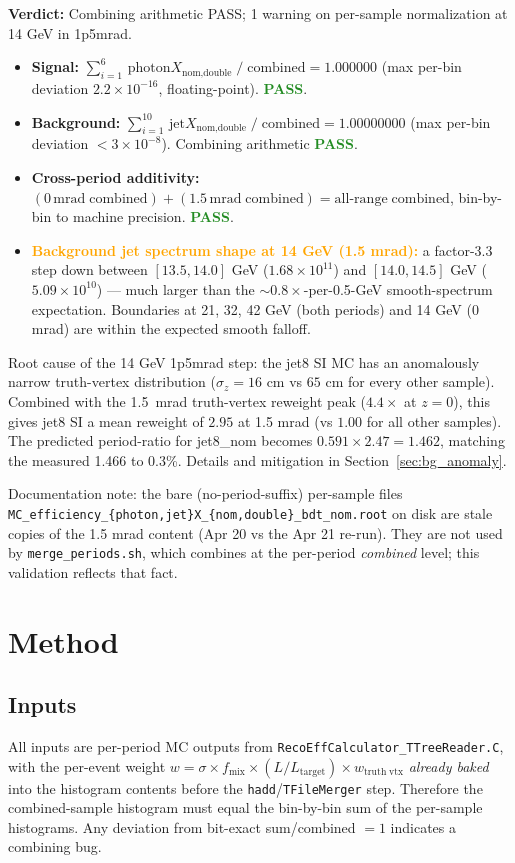 \documentclass[11pt,a4paper]{article}
\newcommand{\warn}[1]{\textcolor{orange}{\textbf{#1}}}
\newcommand{\pass}{\textcolor{ForestGreen}{\textbf{PASS}}}
\begin{document}
\textbf{Verdict:} Combining arithmetic PASS; 1 warning on per-sample normalization at 14 GeV in 1p5mrad.
\begin{itemize}
  \item \textbf{Signal:} $\sum_{i=1}^{6}\,\text{photon}X_{\text{nom,double}} \;/\; \text{combined} = 1.000000$ (max per-bin deviation $2.2\times 10^{-16}$, floating-point). \pass.
  \item \textbf{Background:} $\sum_{i=1}^{10}\,\text{jet}X_{\text{nom,double}} \;/\; \text{combined} = 1.00000000$ (max per-bin deviation $< 3\times 10^{-8}$). Combining arithmetic \pass.
  \item \textbf{Cross-period additivity:} $(\mathrm{0\,mrad\;combined}) + (\mathrm{1.5\,mrad\;combined}) = \mathrm{all\text{-}range\;combined}$, bin-by-bin to machine precision. \pass.
  \item \warn{\textbf{Background jet spectrum shape at 14 GeV (1.5 mrad):}} a factor-3.3 step down between $[13.5, 14.0]$ GeV ($1.68\times10^{11}$) and $[14.0, 14.5]$ GeV ($5.09\times10^{10}$) --- much larger than the $\sim 0.8\times$-per-0.5-GeV smooth-spectrum expectation. Boundaries at 21, 32, 42 GeV (both periods) and 14 GeV (0 mrad) are within the expected smooth falloff.
\end{itemize}

\noindent
Root cause of the 14 GeV 1p5mrad step: the jet8 SI MC has an anomalously narrow truth-vertex distribution ($\sigma_z = 16$ cm vs $65$ cm for every other sample). Combined with the 1.5~mrad truth-vertex reweight peak ($4.4\times$ at $z=0$), this gives jet8 SI a mean reweight of $2.95$ at 1.5 mrad (vs $1.00$ for all other samples). The predicted period-ratio for jet8\_nom becomes $0.591 \times 2.47 = 1.462$, matching the measured 1.466 to 0.3\%. Details and mitigation in Section~\ref{sec:bg_anomaly}.

\noindent
Documentation note: the bare (no-period-suffix) per-sample files \texttt{MC\_efficiency\_\{photon,jet\}X\_\{nom,double\}\_bdt\_nom.root} on disk are stale copies of the 1.5 mrad content (Apr 20 vs the Apr 21 re-run). They are not used by \texttt{merge\_periods.sh}, which combines at the per-period \emph{combined} level; this validation reflects that fact.

\section{Method}

\subsection{Inputs}
All inputs are per-period MC outputs from \texttt{RecoEffCalculator\_TTreeReader.C}, with the per-event weight $w = \sigma \times f_\mathrm{mix} \times (L/L_{\mathrm{target}}) \times w_{\mathrm{truth\;vtx}}$ \emph{already baked} into the histogram contents before the \texttt{hadd}/\texttt{TFileMerger} step. Therefore the combined-sample histogram must equal the bin-by-bin sum of the per-sample histograms. Any deviation from bit-exact sum/combined $=1$ indicates a combining bug.
\end{document}
